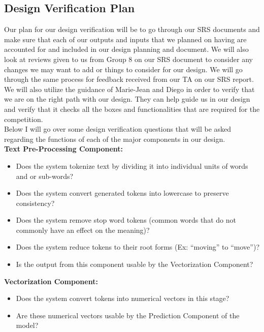 \documentclass[12pt, titlepage]{article}
\begin{document}
  
  \subsection{Design Verification Plan}
  
  Our plan for our design verification will be to go through our SRS documents and make sure that each of our outputs and inputs that we planned on having are accounted for and included in our design planning and document. We will also look at reviews given to us from Group 8 on our SRS document to consider any changes we may want to add or things to consider for our design. We will go through the same process for feedback received from our TA on our SRS report. We will also utilize the guidance of Marie-Jean and Diego in order to verify that we are on the right path with our design. They can help guide us in our design and verify that it checks all the boxes and functionalities that are required for the competition. \\
  
  Below I will go over some design verification questions that will be asked regarding the functions of each of the major components in our design.\\
  
  \noindent \textbf{Text Pre-Processing Component:}
  \begin{itemize}
  \item Does the system tokenize text by dividing it into individual units of words and or sub-words?
  \item Does the system convert generated tokens into lowercase to preserve consistency?
  \item Does the system remove stop word tokens (common words that do not commonly have an effect on the meaning)?
  \item Does the system reduce tokens to their root forms (Ex: “moving” to “move”)?
  \item Is the output from this component usable by the Vectorization Component?\\
  \end{itemize}
  
  
  
  \noindent \textbf{Vectorization Component:}
  \begin{itemize}
  \item Does the system convert tokens into numerical vectors in this stage?
  \item Are these numerical vectors usable by the Prediction Component of the model?\\
  \end{itemize}
  
\end{document}
